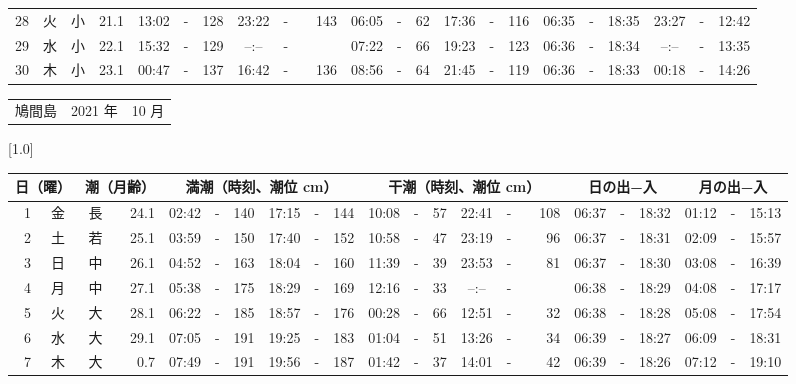 \documentclass[12pt,a4j]{jsarticle}
\begin{document}
\begin{table}[htbp]
\begin{center}
{\begin{tabular}{|rc|cr|ccrccr|ccrccr|ccc|ccc|}
28 & 火 & 小 & 21.1 &  13:02 &-& 128 &  23:22 &-& 143 &  06:05 &-&  62 &  17:36 &-& 116 & 06:35 & -& 18:35 & 23:27 & -& 12:42 \\
29 & 水 & 小 & 22.1 &  15:32 &-& 129 &  --:-- &-&~~~~~ &  07:22 &-&  66 &  19:23 &-& 123 & 06:36 & -& 18:34 & --:-- & -& 13:35 \\
30 & 木 & 小 & 23.1 &  00:47 &-& 137 &  16:42 &-& 136 &  08:56 &-&  64 &  21:45 &-& 119 & 06:36 & -& 18:33 & 00:18 & -& 14:26 \\
   \hline
   \end{tabular}}
   \end{center}
\end{table}
\newpage
 \begin{table}[htbp]
 \begin{center}
 \begin{tabular}{lcc}
 \LARGE{鳩間島}  & \large{2021 年} & \large{10 月} \\
 \end{tabular}
 \end{center}
 \begin{center}
    \scalebox{0.7}[1.0]{
    \begin{tabular}{|rc|cr|ccrccr|ccrccr|ccc|ccc|}
    \hline
    \multicolumn{2}{|c|}{日（曜）} & \multicolumn{2}{c|}{潮（月齢）} & \multicolumn{6}{c|}{満潮（時刻、潮位 cm）} & \multicolumn{6}{c|}{干潮（時刻、潮位 cm）} & \multicolumn{3}{c|}{日の出−入} &  \multicolumn{3}{c|}{月の出−入}\\
 \hline
 1 & 金 & 長 & 24.1 &  02:42 &-& 140 &  17:15 &-& 144 &  10:08 &-&  57 &  22:41 &-& 108 & 06:37 & -& 18:32 & 01:12 & -& 15:13 \\
 2 & 土 & 若 & 25.1 &  03:59 &-& 150 &  17:40 &-& 152 &  10:58 &-&  47 &  23:19 &-&  96 & 06:37 & -& 18:31 & 02:09 & -& 15:57 \\
 3 & 日 & 中 & 26.1 &  04:52 &-& 163 &  18:04 &-& 160 &  11:39 &-&  39 &  23:53 &-&  81 & 06:37 & -& 18:30 & 03:08 & -& 16:39 \\
 4 & 月 & 中 & 27.1 &  05:38 &-& 175 &  18:29 &-& 169 &  12:16 &-&  33 &  --:-- &-&~~~~~ & 06:38 & -& 18:29 & 04:08 & -& 17:17 \\
 5 & 火 & 大 & 28.1 &  06:22 &-& 185 &  18:57 &-& 176 &  00:28 &-&  66 &  12:51 &-&  32 & 06:38 & -& 18:28 & 05:08 & -& 17:54 \\
 6 & 水 & 大 & 29.1 &  07:05 &-& 191 &  19:25 &-& 183 &  01:04 &-&  51 &  13:26 &-&  34 & 06:39 & -& 18:27 & 06:09 & -& 18:31 \\
 7 & 木 & 大 &  0.7 &  07:49 &-& 191 &  19:56 &-& 187 &  01:42 &-&  37 &  14:01 &-&  42 & 06:39 & -& 18:26 & 07:12 & -& 19:10 \\

\end{tabular}}
\end{center}
\end{table}
\end{document}
